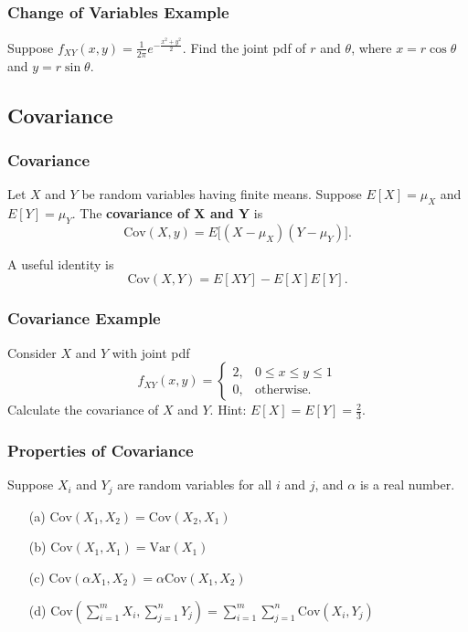 \documentclass{beamer}
\begin{document}
\begin{frame}[t]
\frametitle{Change of Variables Example}
\begin{Example}
Suppose $f_{XY}(x, y) = \frac{1}{2\pi} e^{-\frac{x^2 + y^2}{2}}$. Find the joint pdf of $r$ and $\theta$, where $x = r\cos\theta$ and $y=r\sin\theta$.
\end{Example}
\end{frame}

\subsection{Covariance}
\begin{frame}
\frametitle{Covariance}
\begin{Definition}
Let $X$ and $Y$ be random variables having finite means. Suppose $E[X] = \mu_X$ and $E[Y] = \mu_Y$. The {\bf covariance of $\boldsymbol X$ and $\boldsymbol Y$} is
$$
\text{Cov}(X, y) = E\Big[(X - \mu_X)(Y - \mu_Y)\Big].
$$
\end{Definition}
A useful identity is
$$
\text{Cov}(X, Y) = E[XY] - E[X]E[Y].
$$
\end{frame}

\begin{frame}[t]
\frametitle{Covariance Example}
\tiny
\begin{Example}
Consider $X$ and $Y$ with joint pdf
$$
f_{XY}(x, y) = \begin{cases} 2, &	0\leq x \leq y\leq 1\\ 0,	&	\text{otherwise.}\end{cases}
$$
Calculate the covariance of $X$ and $Y$. Hint: $E[X] = E[Y] =  \frac{2}{3}.$
\end{Example}

\end{frame}

\begin{frame}
\frametitle{Properties of Covariance}
Suppose $X_i$ and $Y_j$ are random variables for all $i$ and $j$, and $\alpha$ is a real number.
\begin{enumerate}
\item[(a)] $\text{Cov}(X_1, X_2) = \text{Cov}(X_2, X_1)$
\item[(b)] $\text{Cov}(X_1, X_1) = \text{Var}(X_1)$
\item[(c)] $\text{Cov}(\alpha X_1, X_2) = \alpha \text{Cov}(X_1, X_2)$
\item[(d)] $\displaystyle \text{Cov}\left(\sum_{i = 1}^m X_i, \sum_{j = 1}^n Y_j\right) = \sum_{i = 1}^m\sum_{j = 1}^n \text{Cov}(X_i, Y_j)$
\end{enumerate}

\end{frame}
\end{document}
